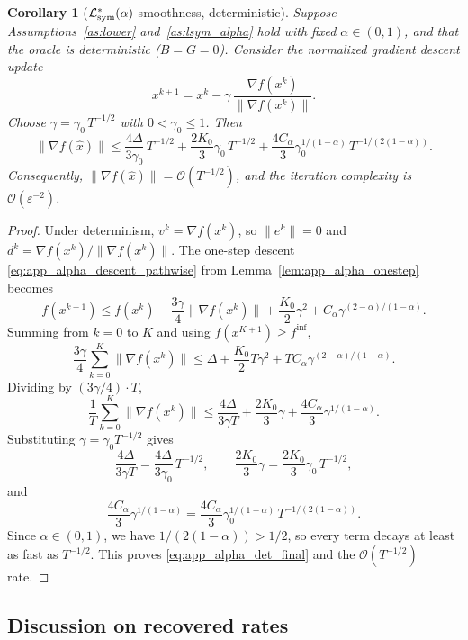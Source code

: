 \documentclass[letter,11pt]{article}
\newtheorem{corollary}{Corollary}[theorem]
\newcommand{\Ocal}{\mathcal{O}}
\newcommand{\Lcal}{\mathcal{L}}
\begin{document}
\begin{corollary}[$\Lcal_{\rm sym}^*(\alpha)$ smoothness, deterministic]
\label{cor:app_alpha_det}
Suppose Assumptions~\ref{as:lower} and~\ref{as:lsym_alpha} hold with fixed
$\alpha\in(0,1)$, and that the oracle is deterministic ($B=G=0$). Consider
the normalized gradient descent update
\[
    x^{k+1} = x^k - \gamma\,\frac{\nabla f(x^k)}{\|\nabla f(x^k)\|}.
\]
Choose $\gamma = \gamma_0\,T^{-1/2}$ with $0<\gamma_0\le 1$. Then
\begin{equation}
\label{eq:app_alpha_det_final}
    \|\nabla f(\widehat x)\|
    \le
    \frac{4\Delta}{3\gamma_0}\,T^{-1/2}
    + \frac{2K_0}{3}\gamma_0\,T^{-1/2}
    + \frac{4C_\alpha}{3}\gamma_0^{1/(1-\alpha)}\,T^{-1/(2(1-\alpha))}.
\end{equation}
Consequently,
$\|\nabla f(\widehat x)\| = \Ocal(T^{-1/2})$,
and the iteration complexity is $\Ocal(\varepsilon^{-2})$.
\end{corollary}

\begin{proof}
Under determinism, $v^k=\nabla f(x^k)$, so $\|e^k\|=0$ and
$d^k=\nabla f(x^k)/\|\nabla f(x^k)\|$. The one-step descent
\eqref{eq:app_alpha_descent_pathwise} from Lemma~\ref{lem:app_alpha_onestep}
becomes
\[
    f(x^{k+1})
    \le f(x^k)
    - \frac{3\gamma}{4}\|\nabla f(x^k)\|
    + \frac{K_0}{2}\gamma^2
    + C_\alpha\gamma^{(2-\alpha)/(1-\alpha)}.
\]
Summing from $k=0$ to $K$ and using $f(x^{K+1})\ge f^{\inf}$,
\[
    \frac{3\gamma}{4}\sum_{k=0}^K \|\nabla f(x^k)\|
    \le \Delta
    + \frac{K_0}{2}T\gamma^2
    + TC_\alpha\gamma^{(2-\alpha)/(1-\alpha)}.
\]
Dividing by $(3\gamma/4)\cdot T$,
\[
    \frac{1}{T}\sum_{k=0}^K \|\nabla f(x^k)\|
    \le \frac{4\Delta}{3\gamma T}
    + \frac{2K_0}{3}\gamma
    + \frac{4C_\alpha}{3}\gamma^{1/(1-\alpha)}.
\]
Substituting $\gamma=\gamma_0 T^{-1/2}$ gives
\[
    \frac{4\Delta}{3\gamma T}
    = \frac{4\Delta}{3\gamma_0}\,T^{-1/2},
    \qquad
    \frac{2K_0}{3}\gamma
    = \frac{2K_0}{3}\gamma_0\,T^{-1/2},
\]
and
\[
    \frac{4C_\alpha}{3}\gamma^{1/(1-\alpha)}
    = \frac{4C_\alpha}{3}\gamma_0^{1/(1-\alpha)}\,T^{-1/(2(1-\alpha))}.
\]
Since $\alpha\in(0,1)$, we have $1/(2(1-\alpha))>1/2$, so every term decays
at least as fast as $T^{-1/2}$. This proves \eqref{eq:app_alpha_det_final}
and the $\Ocal(T^{-1/2})$ rate.
\end{proof}

\subsection{Discussion on recovered rates}
\label{app:nsgdm_recovery_discussion}
\end{document}
